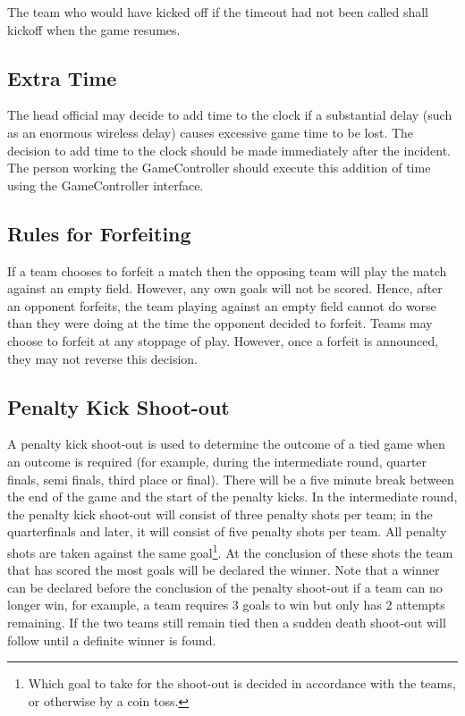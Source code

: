 \documentclass[12pt]{article}
\begin{document}
The team who would have kicked off if the timeout had not been called shall kickoff when the game resumes.

\subsection{Extra Time}
\label{sec:extra_time}
The head official may decide to add time to the clock if a substantial delay (such as an enormous wireless delay) causes excessive game time to be lost.  The decision to add time to the clock should be made immediately after the incident.  The person working the GameController should execute this addition of time using the GameController interface.

\subsection{Rules for Forfeiting}
\label{sec:forfeit}

If a team chooses to forfeit a match then the opposing team will play the match against an empty field.  However, any own goals will not be scored.  Hence, after an opponent forfeits, the team playing against an empty field cannot do worse than they were doing at the time the opponent decided to forfeit.  Teams may choose to forfeit at any stoppage of play.  However, once a forfeit is announced, they may not reverse this decision.


\subsection{Penalty Kick Shoot-out}
\label{sec:penalty_shoot-out}

A penalty kick shoot-out is used to determine the outcome of a tied game when an outcome is required (for example, during the intermediate round, quarter finals, semi finals, third place or final). 
There will be a five minute break between the end of the game and the start of the penalty kicks.
In the intermediate round, the penalty kick shoot-out will consist of three penalty shots per team; in the quarterfinals and later, it will consist of five penalty shots per team.
All penalty shots are taken against the same goal\footnote{Which goal to take for the shoot-out is decided in accordance with the teams, or otherwise by a coin toss.}. At the conclusion of these shots the team that has scored the most goals will be declared the winner. Note that a winner can be declared before the conclusion of the penalty shoot-out if a team can no longer win, for example, a team requires 3 goals to win but only has 2 attempts remaining. If the two teams still remain tied then a sudden death shoot-out will follow until a definite winner is found.
\end{document}
